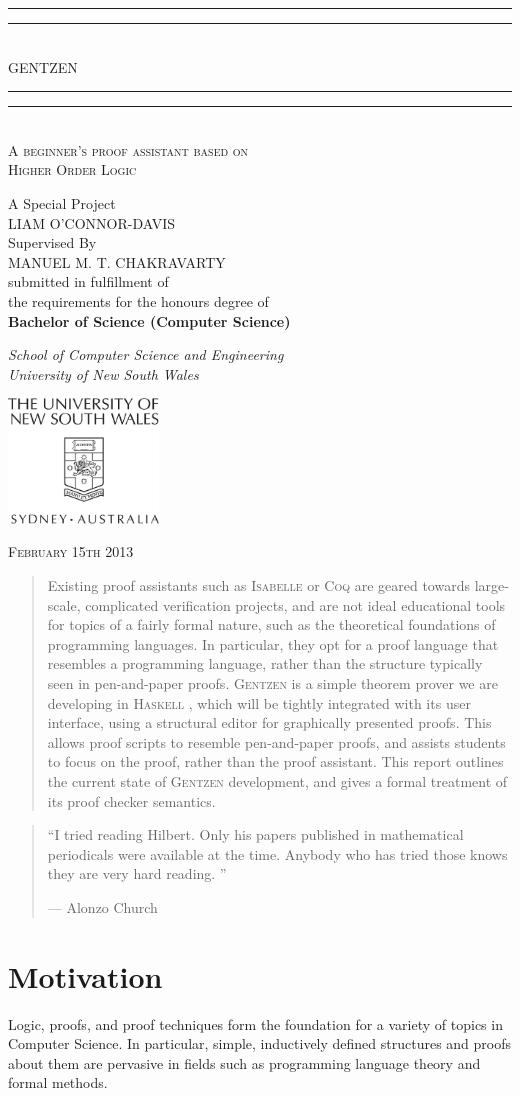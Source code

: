\documentclass[a4paper]{jfp}
\newlength{\tpheight}\setlength{\tpheight}{0.9\textheight}
\newlength{\txtheight}\setlength{\txtheight}{0.9\tpheight}
\newlength{\tpwidth}\setlength{\tpwidth}{0.9\textwidth}
\newlength{\txtwidth}\setlength{\txtwidth}{0.9\tpwidth}
\newlength{\drop}
\newcommand*{\titleGP}{\begingroup%

\drop=0.1\txtheight
\centering
\vspace*{\baselineskip}
\rule{\txtwidth}{1.6pt}\vspace*{-\baselineskip}\vspace*{2pt}
\rule{\txtwidth}{0.4pt}\\[\baselineskip]
{\LARGE GENTZEN}\\[0.2\baselineskip]
\rule{\txtwidth}{0.4pt}\vspace*{-\baselineskip}\vspace{3.2pt}
\rule{\txtwidth}{1.6pt}\\[\baselineskip]
\scshape
A beginner's proof assistant based on \\
Higher Order Logic\\
\par
\vspace*{2\baselineskip}
A Special Project \\[\baselineskip]
{\Large LIAM O'CONNOR-DAVIS}
 \\[\baselineskip]
Supervised By \\[\baselineskip]
{\Large MANUEL M. T. CHAKRAVARTY}
 \\[\baselineskip]
 submitted in fulfillment of \\ the requirements for the honours degree of \\
 \textbf{Bachelor of Science (Computer Science)}
 \\[\baselineskip]
{\itshape School of Computer Science and Engineering \\ University of New South Wales \par}
\vfill
\includegraphics[width=4cm]{unswcrest.pdf} \\

\medskip

{\scshape February 15th 2013} \\
\par
\endgroup}
\begin{document}
\setlength{\parskip}{9pt plus 1pt minus 1pt}
\pagestyle{empty}
\titleGP
\clearpage
\pagestyle{plain}
\begin{abstract}

        Existing proof assistants such as \textsc{Isabelle} \cite{Nipkow-Paulson-Wenzel:2002} or \textsc{Coq} \cite{Team:vw} are geared towards large-scale, complicated
  verification projects, and are not ideal educational tools for topics of a fairly formal nature,
  such as the theoretical foundations of programming languages. In particular, they opt for a proof
  language that resembles a programming language, rather than the structure typically seen in
  pen-and-paper proofs. \textsc{Gentzen} is a simple theorem prover we are developing in \textsc{Haskell} \cite{Anonymous:2010we}, which will be
  tightly integrated with its user interface, using a structural editor for graphically presented
  proofs. This allows proof scripts to resemble pen-and-paper proofs, and assists students to focus
  on the proof, rather than the proof assistant. This report outlines the current state of \textsc{Gentzen} development, and gives a formal treatment of its proof checker semantics.
\end{abstract}

\tableofcontents
\newpage
             \vspace*{\fill}
\begin{quote}
\large

``I tried reading Hilbert. Only his papers published in mathematical
periodicals were available at the time. Anybody who has tried those knows they
are very hard reading. ''

\begin{flushright}
   --- Alonzo Church
\end{flushright}
\normalsize
\end{quote}

             \vspace*{\fill}
\newpage

\section{Motivation}

Logic, proofs, and proof techniques form the foundation for a variety of topics in Computer Science.
In particular, simple, inductively defined structures and proofs about them are pervasive in fields such as
programming language theory and formal methods.
\end{document}
